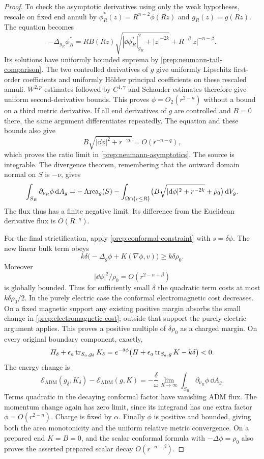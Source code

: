\begin{proof}
To check the asymptotic derivatives using only the weak hypotheses,
rescale on fixed end annuli by
$\phi_R^*(z)=R^{n-2}\phi(Rz)$ and $g_R(z)=g(Rz)$.
The equation becomes
\[
 -\Delta_{g_R}\phi_R^*
 =RB(Rz)\sqrt{|\dd\phi_R^*|_{g_R}^2+|z|^{-2k}}
       +R^{-\beta}|z|^{-n-\beta}.
\]
Its solutions have uniformly bounded suprema by
\eqref{prep:neumann-tail-comparison}.  The two controlled derivatives
of $g$ give uniformly Lipschitz first-order coefficients and uniformly
H\"older principal coefficients on these rescaled annuli.
$W^{2,p}$ estimates followed by $C^{1,\gamma}$ and Schauder estimates
therefore give uniform second-derivative bounds.  This proves
$\phi=O_2(r^{2-n})$ without a bound on a third metric derivative.
If all end derivatives of $g$ are controlled and $B=0$ there, the same
argument differentiates repeatedly.  The equation and these bounds
also give
\[
 B\sqrt{|\dd\phi|^2+r^{-2k}}=O(r^{-n-q}),
\]
which proves the ratio limit in
\eqref{prep:neumann-asymptotics}.  The source is integrable.  The
divergence theorem, remembering that the outward domain normal on
$S$ is $-\nu$, gives
\begin{equation}
 \label{prep:neumann-flux}
 \int_{S_R}\partial_{\nu_R}\phi\,\mathrm d A_g
 =-\operatorname{Area}_g(S)-\int_{\Omega\cap\{r\leq R\}}
       \bigl(B\sqrt{|\mathrm d\phi|^2+r^{-2k}}+\rho_0\bigr)\,\mathrm d V_g.
\end{equation}
The flux thus has a finite negative limit.  Its difference from the
Euclidean derivative flux is $O(R^{-q})$.

For the final strictification, apply
\eqref{prep:conformal-constraint} with $s=\delta\phi$.
The new linear bulk term obeys
\[
 k\delta\bigl(-\Delta_g\phi+K(\nabla\phi,v)\bigr)
 \geq k\delta\rho_0.
\]
Moreover
\[
 |\dd\phi|^2/\rho_0=O(r^{2-n+\beta})
\]
is globally bounded.  Thus for sufficiently small $\delta$ the
quadratic term costs at most $k\delta\rho_0/2$.  In the purely electric
case the conformal electromagnetic cost decreases.  On a fixed
magnetic support any existing positive margin absorbs the small
change in \eqref{prep:electromagnetic-cost}; outside that support the
purely electric argument applies.  This proves a positive multiple
of $\delta\rho_0$ as a charged margin.  On every original boundary
component, exactly,
\[
 H_\delta+\epsilon_a\operatorname{tr}_{S_a,g_\delta}K_\delta
 =e^{-\delta\phi}
       \bigl(H+\epsilon_a\operatorname{tr}_{S_a,g}K-k\delta\bigr)<0.
\]
The energy change is
\begin{equation}
 \label{prep:strictification-energy}
 \mathcal E_{\mathrm{ADM}}(g_\delta,K_\delta)
       -\mathcal E_{\mathrm{ADM}}(g,K)
 =-\frac\delta\omega
       \lim_{R\to\infty}\int_{S_R}\partial_{\nu_R}\phi\,\dd A_g.
\end{equation}
Terms quadratic in the decaying conformal factor have vanishing ADM
flux.  The momentum change again has zero limit, since its integrand
has one extra factor $\phi=O(r^{2-n})$.  Charge is fixed by $\alpha$.
Finally $\phi$ is positive and bounded, giving both the area
monotonicity and the uniform relative metric convergence.  On a
prepared end $K=B=0$, and the scalar conformal formula with
$-\Delta\phi=\rho_0$ also proves the asserted prepared scalar decay
$O(r^{-n-\beta})$.
\end{proof}

